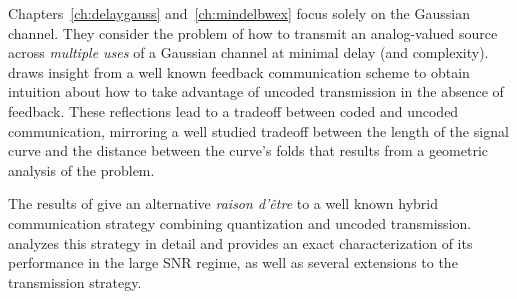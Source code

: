 Chapters~\ref{ch:delaygauss} and~\ref{ch:mindelbwex} focus solely on the
Gaussian channel. They consider the problem of how to transmit an analog-valued
source across \emph{multiple uses} of a Gaussian channel at minimal delay (and
complexity).   draws insight from a well known feedback
communication scheme to obtain intuition about how to take advantage of uncoded
transmission in the absence of feedback. These reflections lead to a tradeoff
between coded and uncoded communication, mirroring a well studied tradeoff
between the length of the signal curve and the distance between the curve's
folds that results from a geometric analysis of the problem.

The results of  give an alternative \emph{raison d'\^etre}
to a well known hybrid communication strategy combining quantization and uncoded
transmission.   analyzes this strategy in detail and
provides an exact characterization of its performance in the large SNR regime,
as well as several extensions to the transmission strategy. 





